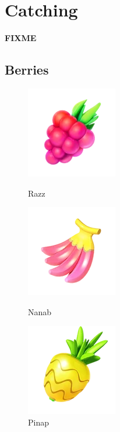 \section{Catching}
\label{sec:catch}
\textbf{FIXME}

\subsection{Berries}
\begin{figure}[h!]
  \begin{minipage}[t]{0.3\textwidth}
    \begin{center}
    \includegraphics[scale=.4]{images/razz.png}
    \end{center}
    \caption[Razz berry]{Razz}
    \label{fig:razz}
  \end{minipage}
  \begin{minipage}[t]{0.3\textwidth}
    \begin{center}
    \includegraphics[scale=.4]{images/nanab.png}
    \end{center}
    \caption[Nanab berry]{Nanab}
    \label{fig:nanab}
  \end{minipage}
  \begin{minipage}[t]{0.3\textwidth}
    \begin{center}
    \includegraphics[scale=.4]{images/pinap.png}
    \end{center}
    \caption[Pinap berry]{Pinap}
    \label{fig:pinap}
  \end{minipage}
\end{figure}

